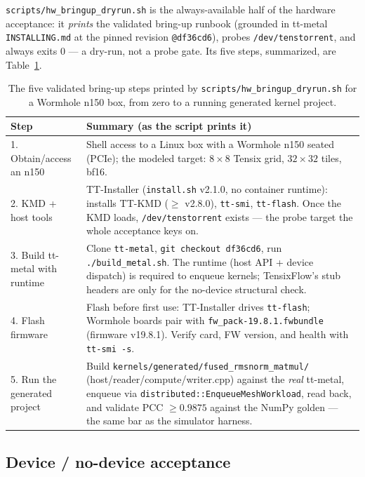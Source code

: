 \texttt{scripts/hw\_bringup\_dryrun.sh} is the always-available half of the
hardware acceptance: it \emph{prints} the validated bring-up runbook (grounded
in tt-metal \texttt{INSTALLING.md} at the pinned revision \texttt{@df36cd6}),
probes \texttt{/dev/tenstorrent}, and always exits 0 --- a dry-run, not a
probe gate. Its five steps, summarized, are Table~\ref{tab:hardware-bringup}.

\begin{table}[htbp]
  \centering
  \caption{The five validated bring-up steps printed by
  \texttt{scripts/hw\_bringup\_dryrun.sh} for a Wormhole n150 box, from zero
  to a running generated kernel project.}
  \label{tab:hardware-bringup}
  \begin{tabular}{@{}lp{9.6cm}@{}}
    \toprule
    \textbf{Step} & \textbf{Summary (as the script prints it)} \\
    \midrule
    1. Obtain/access an n150 & Shell access to a Linux box with a Wormhole n150 seated (PCIe); the modeled target: $8\times8$ Tensix grid, $32\times32$ tiles, bf16. \\
    2. KMD + host tools & TT-Installer (\texttt{install.sh} v2.1.0, no container runtime): installs TT-KMD ($\ge$ v2.8.0), \texttt{tt-smi}, \texttt{tt-flash}. Once the KMD loads, \texttt{/dev/tenstorrent} exists --- the probe target the whole acceptance keys on. \\
    3. Build tt-metal with runtime & Clone \texttt{tt-metal}, \texttt{git checkout df36cd6}, run \texttt{./build\_metal.sh}. The runtime (host API + device dispatch) is required to enqueue kernels; TensixFlow's stub headers are only for the no-device structural check. \\
    4. Flash firmware & Flash before first use: TT-Installer drives \texttt{tt-flash}; Wormhole boards pair with \texttt{fw\_pack-19.8.1.fwbundle} (firmware v19.8.1). Verify card, FW version, and health with \texttt{tt-smi -s}. \\
    5. Run the generated project & Build \texttt{kernels/generated/fused\_rmsnorm\_matmul/} (host/reader/compute/writer.cpp) against the \emph{real} tt-metal, enqueue via \texttt{distributed::EnqueueMeshWorkload}, read back, and validate PCC $\ge 0.9875$ against the NumPy golden --- the same bar as the simulator harness. \\
    \bottomrule
  \end{tabular}
\end{table}

\subsection{Device / no-device acceptance}\label{sec:hardware-acceptance}

